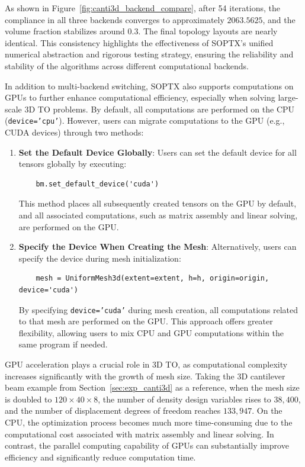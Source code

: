 \documentclass[mathpazo]{cicp}
\begin{document}
As shown in Figure~\ref{fig:canti3d_backend_compare}, after 54 iterations, the compliance in all three backends converges to approximately $2063.5625$, and the volume fraction stabilizes around $0.3$. The final topology layouts are nearly identical. This consistency highlights the effectiveness of SOPTX's unified numerical abstraction and rigorous testing strategy, ensuring the reliability and stability of the algorithms across different computational backends.

In addition to multi-backend switching, SOPTX also supports computations on GPUs to further enhance computational efficiency, especially when solving large-scale 3D TO problems. By default, all computations are performed on the CPU (\texttt{device='cpu'}). However, users can migrate computations to the GPU (e.g., CUDA devices) through two methods:
\begin{enumerate}
	\item \textbf{Set the Default Device Globally}: Users can set the default device for all tensors globally by executing:
	\begin{lstlisting}
	bm.set_default_device('cuda')
	\end{lstlisting}
	This method places all subsequently created tensors on the GPU by default, and all associated computations, such as matrix assembly and linear solving, are performed on the GPU.
	\item \textbf{Specify the Device When Creating the Mesh}: Alternatively, users can specify the device during mesh initialization:
	\begin{lstlisting}
	mesh = UniformMesh3d(extent=extent, h=h, origin=origin, device='cuda')
	\end{lstlisting}
	By specifying \texttt{device='cuda'} during mesh creation, all computations related to that mesh are performed on the GPU. This approach offers greater flexibility, allowing users to mix CPU and GPU computations within the same program if needed.
\end{enumerate}

GPU acceleration plays a crucial role in 3D TO, as computational complexity increases significantly with the growth of mesh size. Taking the 3D cantilever beam example from Section~\ref{sec:exp_canti3d} as a reference, when the mesh size is doubled to $120\times40\times8$, the number of density design variables rises to $38,400$, and the number of displacement degrees of freedom reaches $133,947$. On the CPU, the optimization process becomes much more time-consuming due to the computational cost associated with matrix assembly and linear solving. In contrast, the parallel computing capability of GPUs can substantially improve efficiency and significantly reduce computation time.
\end{document}

